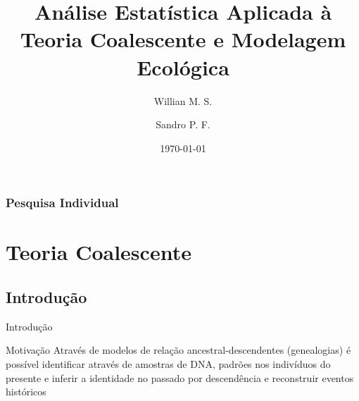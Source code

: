 \documentclass{beamer}
\title{Análise Estatística Aplicada à Teoria Coalescente e Modelagem Ecológica}
\author{Willian M. S.\inst{1} \and Sandro P. F.\inst{2}}
\institute[UFPR] %
{
  \inst{1}%
  Aluno de Graduação - Bolsista Pet\\
  Departmento de Estatística - UFPR
  \and
  \inst{2}%
  Aluno PhD - PPG Zoology\\
  Laboratory of Ecology and Evolution of Interactions - UFPR
  }
\date{\today}
\begin{document}
\begin{frame}
\titlepage %
\end{frame}



\begin{frame}
\frametitle{Pesquisa Individual} %
\tableofcontents %
\end{frame}


\section{Teoria Coalescente} %

\subsection{Introdução}
    \begin{frame}{Introdução}

        \begin{block}{Motivação}
            Através de modelos de relação ancestral-descendentes (genealogias) é possível identificar através de amostras de DNA, padrões nos indivíduos do presente e inferir a identidade no passado por descendência e reconstruir eventos históricos
        \end{block}
          
    
    \end{frame}
\end{document}
